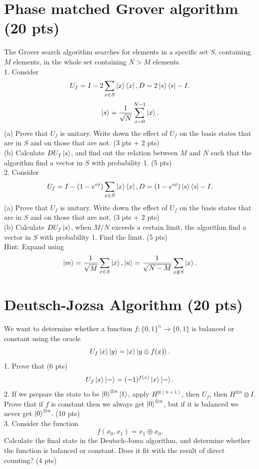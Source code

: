 \documentclass[12pt]{article}
\begin{document}
\section{Phase matched Grover algorithm (20 pts)}
The Grover search algorithm searches for elements in a specific set $S$, containing $M$ elements, in the whole set containing $N>M$ elements.\\
1. Consider
\[U_f=I-2\sum_{x\in S}\ket x\bra x, D=2\ket s\bra s-I.\]
\[\ket s=\frac{1}{\sqrt N}\sum_{x=0}^{N-1}\ket x.\]
(a) Prove that $U_f$ is unitary. Write down the effect of $U_f$ on the basis states that are in $S$ and on those that are not. (3 pts + 2 pts)\\
(b) Calculate $DU_f\ket s$, and find out the relation between $M$ and $N$ such that the algorithm find a vector in $S$ with probability 1. (5 pts)\\
2. Consider
\[U_f=I-(1-e^{i\phi})\sum_{x\in S}\ket x\bra x, D=(1-e^{i\phi})\ket s\bra s-I.\]
(a) Prove that $U_f$ is unitary. Write down the effect of $U_f$ on the basis states that are in $S$ and on those that are not. (3 pts + 2 pts)\\
(b) Calculate $DU_f\ket s$, when $M/N$ exceeds a certain limit, the algorithm find a vector in $S$ with probability 1. Find the limit. (5 pts)\\
Hint: Expand using
\[\ket m=\frac{1}{\sqrt M}\sum_{x\in S}\ket x,\ket u=\frac{1}{\sqrt {N-M}}\sum_{x\notin S}\ket x.\]

\section{Deutsch-Jozsa Algorithm (20 pts)}
We want to determine whether a function $f:\{0,1\}^n\xrightarrow{} \{0,1\}$ is balanced or constant using the oracle
\[U_f\ket x \ket y=\ket x\ket{y\oplus f(x)}.\]
1. Prove that (6 pts)
\[U_f\ket x\ket -=(-1)^{f(x)}\ket x \ket -.\]
2. If we prepare the state to be $\ket 0^{\otimes n}\ket 1$, apply $H^{\otimes(n+1)}$, then $U_f$, then $H^{\otimes n}\otimes I$. Prove that if $f$ is constant then we always get $\ket 0^{\otimes n}$, but if it is balanced we never get $\ket 0^{\otimes n}$. (10 pts)\\
3. Consider the function
\[f(x_0,x_1)=x_1 \oplus x_0.\]
Calculate the final state in the Deutsch-Jozsa algorithm, and determine whether the function is balanced or constant. Does it fit with the result of direct counting? (4 pts)
\end{document}
